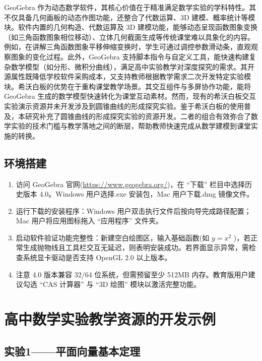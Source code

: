 GeoGebra 作为动态数学软件，其核心价值在于精准满足数学实验的学科特性。其不仅具备几何画板的动态作图功能，还整合了代数运算、3D 建模、概率统计等模块。软件内置的几何构造、代数运算及 3D 建模功能，能够动态呈现函数图象变换（如三角函数图象相位移动）、立体几何截面生成等传统课堂难以具象化的内容。例如，在讲解三角函数图象平移伸缩变换时，学生可通过调控参数滑动条，直观观察图象的变化过程。此外，GeoGebra 支持脚本指令与自定义工具，能快速构建复杂数学模型（如分形、微积分曲线），满足高中实验教学对深度探究的需求。其开源属性既降低学校软件采购成本，又支持教师根据教学需求二次开发特定实验模块。希沃白板的优势在于重构课堂教学场景。其交互组件与多屏协作功能，能将 GeoGebra 生成的数学模型快速转化为课堂互动素材。然而，现有的希沃白板交互实验演示资源并未开发涉及到圆锥曲线的形成探究实验。鉴于希沃白板的使用普及，本研究补充了圆锥曲线的形成探究实验的资源开发。二者的组合有效弥合了数学实验的技术门槛与教学落地之间的断层，帮助教师快速完成从数学建模到课堂实施的转换。


\subsection{环境搭建}

\begin{enumerate}
  \item 访问 GeoGebra 官网(\url{https://www.geogebra.org/})，在 “下载” 栏目中选择历史版本 4.0。Windows 用户选择.exe 安装包，Mac 用户下载.dmg 镜像文件。
  \item 运行下载的安装程序：Windows 用户双击执行文件后按向导完成路径配置； Mac 用户将应用图标拖入 “应用程序” 文件夹。
  \item 启动软件验证功能完整性：新建空白绘图区，输入基础函数(如 \(y = x^2\) )，若正常生成抛物线且工具栏交互无延迟，则表明安装成功。若界面显示异常，需检查系统显卡驱动是否支持 OpenGL 2.0 以上版本。
  \item 注意 4.0 版本兼容 32/64 位系统，但需预留至少 512MB 内存。教育版用户建议勾选 “CAS 计算器” 与 “3D 绘图” 模块以激活完整功能。
\end{enumerate}


\section{高中数学实验教学资源的开发示例}
\subsection{实验1——平面向量基本定理}

